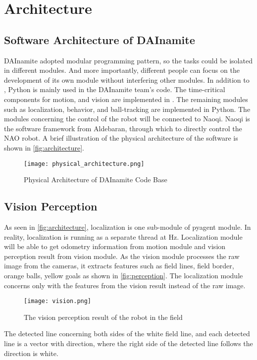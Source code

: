 \chapter{Architecture\label{cha:chapter3}}



\section{Software Architecture of DAInamite}\label{sec:3.1}
DAInamite adopted modular programming pattern, so the tasks could be isolated in different modules. And more importantly, different people can focus on the development of its own module without interfering other modules. In addition to \cpp{}, Python is mainly used in the DAInamite team's code.
The time-critical components for motion, and vision are implemented in \cpp{}. The remaining modules such as localization, behavior, and ball-tracking are implemented in Python. The modules concerning the control of the robot will be connected to Naoqi. Naoqi is the software framework from Aldebaran, through which to directly control the NAO robot. A brief illustration of the physical architecture of the software is shown in \autoref{fig:architecture}. 

\begin{figure}[h!]
  \centering
  \texttt{[image: physical\_architecture.png]}
  \caption{Physical Architecture of DAInamite Code Base}
  \label{fig:architecture}
\end{figure}

\section{Vision Perception}\label{sec:3.2}
As seen in \autoref{fig:architecture}, localization is one sub-module of pyagent module. In reality, localization is running as a separate thread at \unit[30]{Hz}. Localization module will be able to get odometry information from motion module and vision perception result from vision module. As the vision module processes the raw image from the cameras, it extracts features such as field lines, field border, orange balls, yellow goals as shown in \autoref{fig:perception}. The localization module concerns only with the features from the vision result instead of the raw image.

\begin{figure}[h!]
  \centering
  \texttt{[image: vision.png]}
  \caption{The vision perception result of the robot in the field}
  \label{fig:perception}
\end{figure}

The detected line concerning both sides of the white field line, and each detected line is a vector with direction, where the right side of the detected line follows the direction is white.

